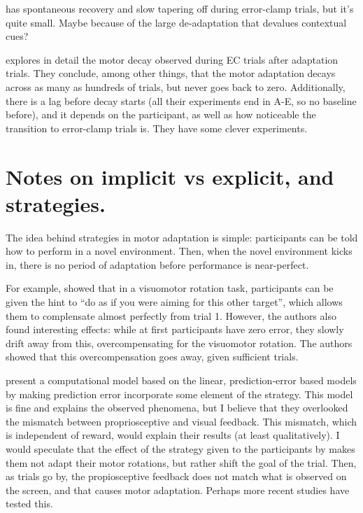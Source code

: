 \documentclass{report}
\begin{document}
\cite{Forano_Timescales_2020} has spontaneous recovery and slow tapering off
during error-clamp trials, but it's quite small. Maybe because of the large
de-adaptation that devalues contextual cues?

\cite{Vaswani_Decay_2013} explores in detail the motor decay observed during EC
trials after adaptation trials. They conclude, among other things, that the
motor adaptation decays across as many as hundreds of trials, but never goes
back to zero. Additionally, there is a lag before decay starts (all their
experiments end in A-E, so no baseline before), and it depends on the
participant, as well as how noticeable the transition to error-clamp trials
is. They have some clever experiments.


\section{Notes on implicit vs explicit, and strategies.}
The idea behind strategies in motor adaptation is simple: participants can be
told how to perform in a novel environment. Then, when the novel environment
kicks in, there is no period of adaptation before performance is near-perfect.

For example, \cite{Taylor_Flexible_2011,Mazzoni_Implicit_2006} showed that in a
visuomotor rotation task, participants can be given the hint to ``do as if you
were aiming for this other target'', which allows them to complensate almost
perfectly from trial 1. However, the authors also found interesting effects:
while at first participants have zero error, they slowly drift away from this,
overcompensating for the visuomotor rotation. The authors showed that this
overcompensation goes away, given sufficient trials.

\cite{Taylor_Flexible_2011} present a computational model based on the linear,
prediction-error based models \citep[e.g.][]{Smith_Interacting_2006} by making
prediction error incorporate some element of the strategy. This model is fine
and explains the observed phenomena, but I believe that they overlooked the
mismatch between propriosceptive and visual feedback. This mismatch, which is
independent of reward, would explain their results (at least qualitatively). I
would speculate that the effect of the strategy given to the participants by
\cite{Taylor_Flexible_2011} makes them not adapt their motor rotations, but
rather shift the goal of the trial. Then, as trials go by, the propiosceptive
feedback does not match what is observed on the screen, and that causes motor
adaptation. Perhaps more recent studies have tested this.
\end{document}
